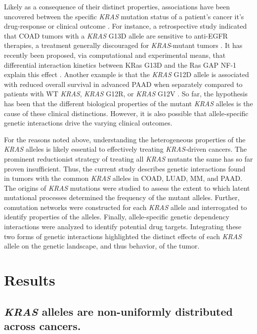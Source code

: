 \documentclass[english, 10pt, letterpaper]{article}
\newcommand{\KRAS}{\emph{KRAS}}
\newcommand{\kras}{KRas}
\begin{document}
Likely as a consequence of their distinct properties, associations have been uncovered between the specific \KRAS{} mutation status of a patient's cancer it's drug-response or clinical outcome \cite{Haigis2017, Li2018}.
For instance, a retrospective study indicated that COAD tumors with a \KRAS{} G13D allele are sensitive to anti-EGFR therapies, a treatment generally discouraged for \KRAS{}-mutant tumors \cite{DeRoock2010}. 
It has recently been proposed, via computational and experimental means, that differential interaction kinetics between \kras{} G13D and the Ras GAP NF-1 explain this effect \cite{McFall2019, Rabara2019, Zafra2019}.
Another example is that the \KRAS{} G12D allele is associated with reduced overall survival in advanced PAAD when separately compared to patients with WT \KRAS{}, \KRAS{} G12R, or \KRAS{} G12V \cite{Bournet2016}.
So far, the hypothesis has been that the different biological properties of the mutant \KRAS{} alleles is the cause of these clinical distinctions.
However, it is also possible that allele-specific genetic interactions drive the varying clinical outcomes.

For the reasons noted above, understanding the heterogeneous properties of the \KRAS{} alleles is likely essential to effectively treating \KRAS{}-driven cancers.
The prominent reductionist strategy of treating all \KRAS{} mutants the same has so far proven insufficient.
Thus, the current study describes genetic interactions found in tumors with the common \KRAS{} alleles in COAD, LUAD, MM, and PAAD.
The origins of \KRAS{} mutations were studied to assess the extent to which latent mutational processes determined the frequency of the mutant alleles.
Further, comutation networks were constructed for each \KRAS{} allele and interrogated to identify properties of the alleles.
Finally, allele-specific genetic dependency interactions were analyzed to identify potential drug targets.
Integrating these two forms of genetic interactions highlighted the distinct effects of each \KRAS{} allele on the genetic landscape, and thus behavior, of the tumor.

\section*{Results}

\subsection*{\KRAS{} alleles are non-uniformly distributed across cancers.}
\end{document}

